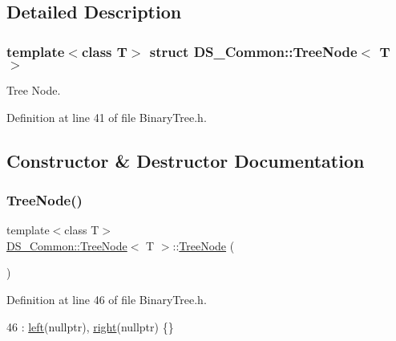 \subsection{Detailed Description}
\subsubsection*{template$<$class T$>$\newline
struct D\+S\+\_\+\+Common\+::\+Tree\+Node$<$ T $>$}

Tree Node. 

Definition at line 41 of file Binary\+Tree.\+h.



\subsection{Constructor \& Destructor Documentation}
\mbox{\label{struct_d_s___common_1_1_tree_node_abedd8beddee85b4d2ebf4178dd012b5f}} 
\subsubsection{\texorpdfstring{Tree\+Node()}{TreeNode()}\hspace{0.1cm}{\footnotesize\ttfamily [1/3]}}
{\footnotesize\ttfamily template$<$class T$>$ \\
\mbox{\hyperlink{struct_d_s___common_1_1_tree_node}{D\+S\+\_\+\+Common\+::\+Tree\+Node}}$<$ T $>$\+::\mbox{\hyperlink{struct_d_s___common_1_1_tree_node}{Tree\+Node}} (\begin{DoxyParamCaption}{ }\end{DoxyParamCaption})\hspace{0.3cm}{\ttfamily [inline]}}



Definition at line 46 of file Binary\+Tree.\+h.


\begin{DoxyCode}
46 : \mbox{\hyperlink{struct_d_s___common_1_1_tree_node_ae2579ab4d93c06c49a5ddaa4097cc55d}{left}}(\textcolor{keyword}{nullptr}), \mbox{\hyperlink{struct_d_s___common_1_1_tree_node_a55f75143e837cd009739ab32f49c93e6}{right}}(\textcolor{keyword}{nullptr}) \{\}
\end{DoxyCode}
\mbox{\label{struct_d_s___common_1_1_tree_node_a7fa8e6ded4baa92f787cccf84cb4f396}} 
